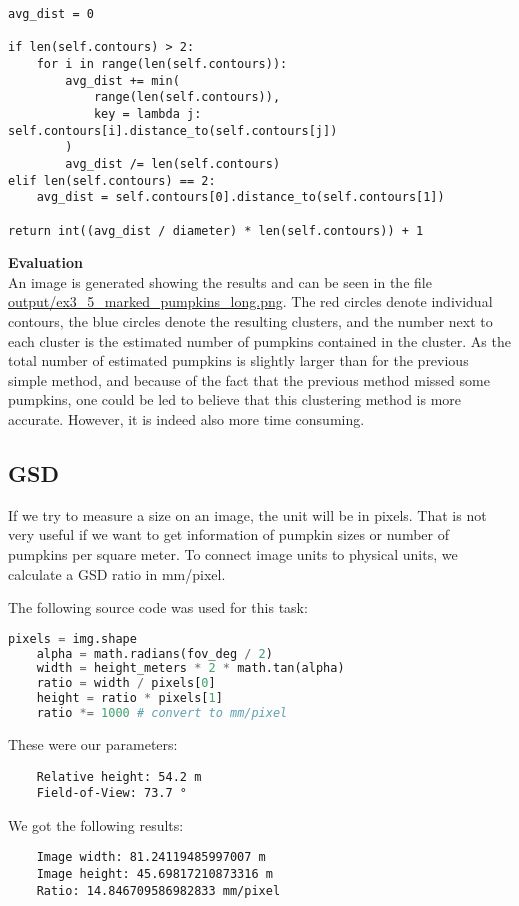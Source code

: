 \documentclass[../Head/Main.tex]{subfiles}
\begin{document}
\begin{verbatim}
avg_dist = 0

if len(self.contours) > 2:
    for i in range(len(self.contours)):
        avg_dist += min(
            range(len(self.contours)),
            key = lambda j: self.contours[i].distance_to(self.contours[j])
        )
        avg_dist /= len(self.contours)
elif len(self.contours) == 2:
    avg_dist = self.contours[0].distance_to(self.contours[1])

return int((avg_dist / diameter) * len(self.contours)) + 1
\end{verbatim}
\textbf{Evaluation}\\
An image is generated showing the results and can be seen in the file \url{output/ex3_5_marked_pumpkins_long.png}. The red circles denote individual contours, the blue circles denote the resulting clusters, and the number next to each cluster is the estimated number of pumpkins contained in the cluster. As the total number of estimated pumpkins is slightly larger than for the previous simple method, and because of the fact that the previous method missed some pumpkins, one could be led to believe that this clustering method is more accurate. However, it is indeed also more time consuming.

\subsection{GSD}\label{subsec:gsd}

If we try to measure a size on an image, the unit will be in pixels. That is not very useful if we want to get information of pumpkin sizes or number of pumpkins per square meter. To connect image units to physical units, we calculate a GSD ratio in mm/pixel.

The following source code was used for this task:

\begin{lstlisting}[language=Python]
    pixels = img.shape
    alpha = math.radians(fov_deg / 2)
    width = height_meters * 2 * math.tan(alpha)
    ratio = width / pixels[0]
    height = ratio * pixels[1]
    ratio *= 1000 # convert to mm/pixel
\end{lstlisting}

These were our parameters:

\begin{verbatim}
    Relative height: 54.2 m
    Field-of-View: 73.7 °
\end{verbatim}


We got the following results:

\begin{verbatim}
    Image width: 81.24119485997007 m
    Image height: 45.69817210873316 m
    Ratio: 14.846709586982833 mm/pixel
\end{verbatim}
\end{document}

